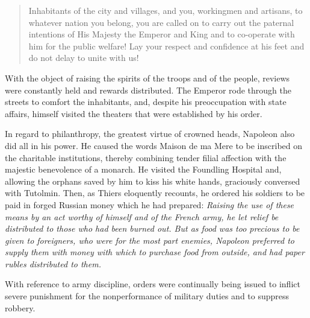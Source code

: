 \begin{quote}
Inhabitants of the city and villages, and you, workingmen and
artisans, to whatever nation you belong, you are called on to
carry out the paternal intentions of His Majesty the Emperor and
King and to co-operate with him for the public welfare! Lay your
respect and confidence at his feet and do not delay to unite with
us!  \end{quote}

With the object of raising the spirits of the troops and of the
people, reviews were constantly held and rewards distributed. The
Emperor rode through the streets to comfort the inhabitants, and,
despite his preoccupation with state affairs, himself visited the
theaters that were established by his order.

In regard to philanthropy, the greatest virtue of crowned heads,
Napoleon also did all in his power. He caused the words Maison de
ma Mere to be inscribed on the charitable institutions, thereby
combining tender filial affection with the majestic benevolence
of a monarch. He visited the Foundling Hospital and, allowing the
orphans saved by him to kiss his white hands, graciously
conversed with Tutolmin. Then, as Thiers eloquently recounts, he
ordered his soldiers to be paid in forged Russian money which he
had prepared: \emph{Raising the use of these means by an act
worthy of himself and of the French army, he let relief be
distributed to those who had been burned out. But as food was too
precious to be given to foreigners, who were for the most part
enemies, Napoleon preferred to supply them with money with which
to purchase food from outside, and had paper rubles distributed
to them.}

With reference to army discipline, orders were continually being
issued to inflict severe punishment for the nonperformance of
military duties and to suppress robbery.



